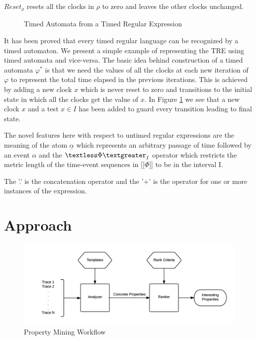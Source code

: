 \documentclass[]{sigplanconf}
\begin{document}
$Reset_\rho$ resets all the clocks in $\rho$ to zero and leaves the other clocks unchanged.

\begin{figure}
\caption{Timed Automata from a Timed Regular Expression}
\label{fig:tretoautomata}
\end{figure}

It has been proved \cite{timedregex} that every timed regular language can be recognized by a timed automaton.  We present a simple example of representing the TRE using timed automata and vice-versa. The basic idea behind construction of a timed automata $\varphi^*$ is that we need the values of all the clocks at each new iteration of $\varphi$ to represent the total time elapsed in the previous iterations. This is achieved by adding a new clock $x$ which is never reset to zero and transitions to the initial state in which all the clocks get the value of $x$. In Figure \ref{fig:tretoautomata} we see that a new clock $x$ and a test $x \in I$ has been added to guard every transition leading to final state.

The novel features here with respect to untimed regular expressions are the meaning of the atom $\underline{\alpha}$ which represents an arbitrary passage of time followed by an event $\alpha$ and the $\textless \Phi \textgreater _I$ operator which restricts the metric length of the time-event sequences in [[$\Phi$]] to be in the interval I.

The '.' is the concatenation operator and the '+' is the operator for one or more instances of the expression.

\section{Approach} \label{Approach}

\begin{figure}[h]
  \centering
  \includegraphics[trim = 1cm 0cm 0cm 0cm,clip = true,width=\linewidth]{figures/Workflow.png}
  \caption{Property Mining Workflow}
  \label{fig:work-flow Overview}
\end{figure}
\end{document}
